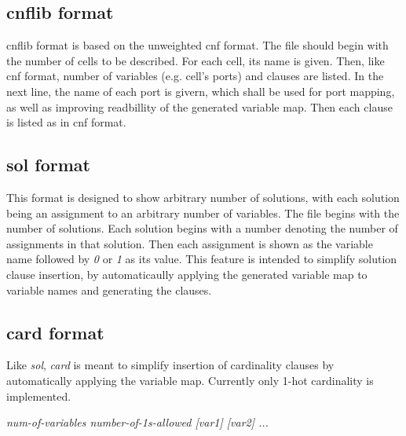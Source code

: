 \documentclass{article}
\begin{document}
    \subsection{cnflib format}
    cnflib format is based on the unweighted cnf format. The file should begin with the number of cells to be described. 
    For each cell, its name is given. Then, like cnf format, number of variables (e.g. cell's ports) and clauses are listed.
    In the next line, the name of each port is givern, which shall be used for port mapping, as well as improving readbillity of 
    the generated variable map. Then each clause is listed as in cnf format. 

    

    \subsection{sol format}
    This format is designed to show arbitrary number of solutions, with each solution being an assignment to an arbitrary number 
    of variables. The file begins with the number of solutions. 
    Each solution begins with a number denoting the number of assignments in that solution. Then each assignment is shown as the 
    variable name followed by \textit{0} or \textit{1} as its value. 
    This feature is intended to simplify solution clause insertion, by automaticaully applying the generated variable map to 
    variable names and generating the clauses. 

    

    \subsection{card format}
    Like \textit{sol}, \textit{card} is meant to simplify insertion of cardinality clauses by automatically applying the variable map. 
    Currently only 1-hot cardinality is implemented. 

    \textit{num-of-variables number-of-1s-allowed [var1] [var2] ...}

    
\end{document}
